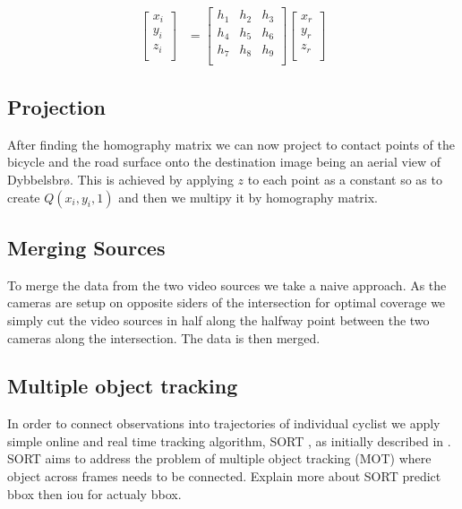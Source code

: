 \documentclass[
10pt, %
a4paper, %
oneside, %
headinclude,footinclude, %
] {book}%
\begin{document}
\begin{align}
\label{eq:3}
  \begin{bmatrix}
    x_{i} \\
    y_{i} \\
    z_{i} \\
  \end{bmatrix}
  &= \begin{bmatrix}
      h_1 & h_2 & h_3 \\
      h_4 & h_5 & h_6 \\
      h_7 & h_8 & h_9 \\
  \end{bmatrix}
  \begin{bmatrix}
    x_{r} \\
    y_{r} \\
    z_{r} \\
  \end{bmatrix}
\end{align}
\subsection{Projection}

After finding the homography matrix we can now project to contact points of the bicycle and the road surface onto the destination
image being an aerial view of Dybbelsbrø. This is achieved by applying $z$ to each point as a constant so as to create $Q(x_i, y_i, 1)$ and then we multipy it by 
homography matrix. 
\ \\
\subsection{Merging Sources}

To merge the data from the two video sources we take a naive approach. As the cameras are setup on
opposite siders of the intersection for optimal coverage we simply cut the video sources in half along the halfway point between
the two cameras along the intersection. The data is then merged.
\ \\
\subsection{Multiple object tracking}

In order to connect observations into trajectories of individual cyclist we apply 
simple online and real time tracking algorithm, SORT \cite{abewley_abewley/sort_2021}, as initially described in \cite{Bewley2016_sort}. 
SORT aims to address the problem of multiple object tracking (MOT) where object across frames needs to be connected. 
Explain more about SORT predict bbox then iou for actualy bbox.
\end{document}
